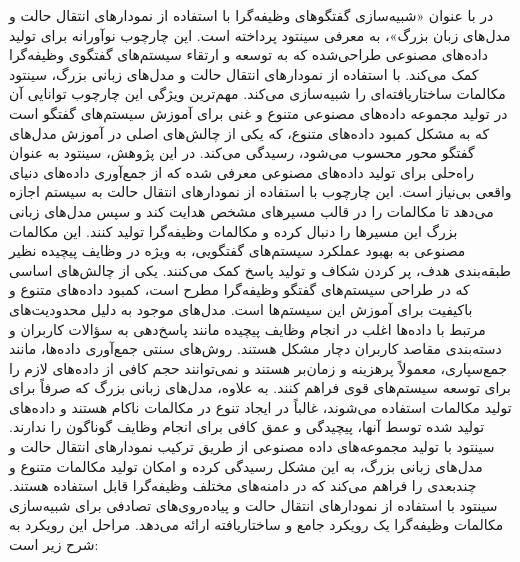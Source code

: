 \begin{enumerate}
در %
\cite{samarinas2024simulating}
با عنوان «شبیه‌سازی گفتگوهای وظیفه‌گرا با استفاده از نمودارهای انتقال حالت و مدل‌های زبان بزرگ»، به معرفی 
سینتود%
 پرداخته است. این چارچوب نوآورانه برای تولید داده‌های مصنوعی طراحی‌شده که به توسعه و ارتقاء سیستم‌های گفتگوی وظیفه‌گرا کمک می‌کند. با استفاده از نمودارهای 
انتقال حالت%
 و مدل‌های زبانی بزرگ، سینتود مکالمات ساختاریافته‌ای را شبیه‌سازی می‌کند. مهم‌ترین ویژگی این چارچوب توانایی آن در تولید مجموعه داده‌های مصنوعی متنوع و غنی برای آموزش سیستم‌های گفتگو است که به مشکل کمبود داده‌های متنوع، که یکی از چالش‌های اصلی در آموزش مدل‌های گفتگو محور محسوب می‌شود، رسیدگی می‌کند.
در این پژوهش، سینتود به عنوان راه‌حلی برای تولید داده‌های مصنوعی معرفی شده که از جمع‌آوری داده‌های دنیای واقعی بی‌نیاز است. این چارچوب با استفاده از نمودارهای انتقال حالت به سیستم اجازه می‌دهد تا مکالمات را در قالب مسیرهای مشخص هدایت کند و سپس مدل‌های زبانی بزرگ این مسیرها را دنبال کرده و مکالمات وظیفه‌گرا تولید کنند. این مکالمات مصنوعی به بهبود عملکرد سیستم‌های گفتگویی، به ویژه در وظایف پیچیده نظیر طبقه‌بندی هدف، پر کردن شکاف و تولید پاسخ کمک می‌کنند.
\newline
یکی از چالش‌های اساسی که در طراحی سیستم‌های گفتگو وظیفه‌گرا مطرح است، کمبود داده‌های متنوع و باکیفیت برای آموزش این سیستم‌ها است. مدل‌های موجود به دلیل محدودیت‌های مرتبط با داده‌ها اغلب در انجام وظایف پیچیده مانند پاسخ‌دهی به سؤالات کاربران و دسته‌بندی مقاصد کاربران دچار مشکل هستند. روش‌های سنتی جمع‌آوری داده‌ها، مانند جمع‌سپاری، معمولاً پرهزینه و زمان‌بر هستند و نمی‌توانند حجم کافی از داده‌های لازم را برای توسعه سیستم‌های قوی فراهم کنند.
به علاوه، مدل‌های زبانی بزرگ که صرفاً برای تولید مکالمات استفاده می‌شوند، غالباً در ایجاد تنوع در مکالمات ناکام هستند و داده‌های تولید شده توسط آنها، پیچیدگی و عمق کافی برای انجام وظایف گوناگون را ندارند. سینتود با تولید مجموعه‌های داده مصنوعی از طریق ترکیب نمودارهای انتقال حالت و مدل‌های زبانی بزرگ، به این مشکل رسیدگی کرده و امکان تولید مکالمات متنوع و چندبعدی را فراهم می‌کند که در دامنه‌های مختلف وظیفه‌گرا قابل استفاده هستند.
\newline
سینتود با استفاده از نمودارهای انتقال حالت و 
پیاده‌روی‌های تصادفی%
 برای شبیه‌سازی مکالمات وظیفه‌گرا یک رویکرد جامع و ساختاریافته ارائه می‌دهد. 
مراحل این رویکرد به شرح زیر است:


\end{enumerate}
